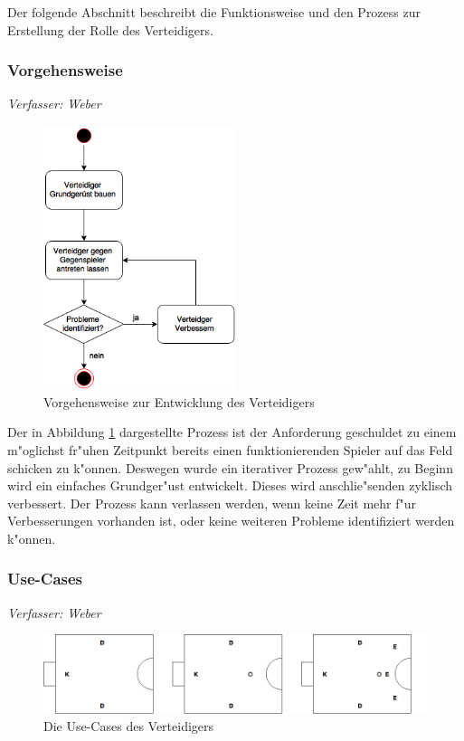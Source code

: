 
Der folgende Abschnitt beschreibt die Funktionsweise und den Prozess zur Erstellung der Rolle des Verteidigers.

\subsubsection{Vorgehensweise}
\textit{Verfasser: Weber}\\

\begin{figure}[H]
	\centering
	\includegraphics[width=0.5\textwidth]{Grafiken/KI/defender/vorgehensweise.png}
	\caption{Vorgehensweise zur Entwicklung des Verteidigers}
	\label{Vorgehensweise-Verteidigers}
\end{figure}
Der in Abbildung \ref{Vorgehensweise-Verteidigers} dargestellte Prozess ist der Anforderung geschuldet zu einem m"oglichst fr"uhen Zeitpunkt bereits einen funktionierenden Spieler auf das Feld schicken zu k"onnen. Deswegen wurde ein iterativer Prozess gew"ahlt, zu Beginn wird ein einfaches Grundger"ust entwickelt. Dieses wird anschlie"senden zyklisch verbessert. Der Prozess kann verlassen werden, wenn keine Zeit mehr f"ur Verbesserungen vorhanden ist, oder keine weiteren Probleme identifiziert werden k"onnen.

\subsubsection{Use-Cases}
\textit{Verfasser: Weber}\\
\begin{figure}[H]
	\centering
	\includegraphics[width=\ScaleIfNeeded]{Grafiken/KI/defender/useCases.png}
	\caption{Die Use-Cases des Verteidigers}
	\label{Usecases-Verteidigers}
\end{figure}

